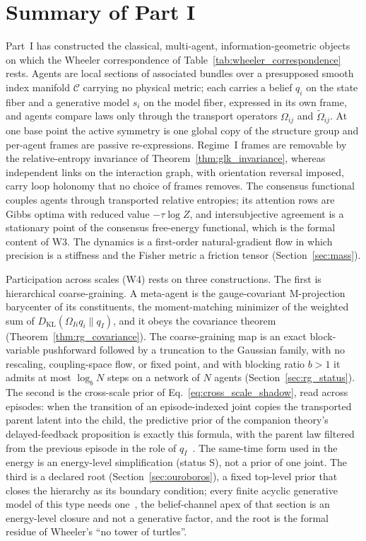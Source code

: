\section{Summary of Part I}\label{sec:conclusion}

Part~I has constructed the classical, multi-agent, information-geometric objects on which the Wheeler correspondence of Table~\ref{tab:wheeler_correspondence} rests. Agents are local sections of associated bundles over a presupposed smooth index manifold $\mathcal{C}$ carrying no physical metric; each carries a belief $q_i$ on the state fiber and a generative model $s_i$ on the model fiber, expressed in its own frame, and agents compare laws only through the transport operators $\Omega_{ij}$ and $\tilde\Omega_{ij}$. At one base point the active symmetry is one global copy of the structure group and per-agent frames are passive re-expressions. Regime~I frames are removable by the relative-entropy invariance of Theorem~\ref{thm:glk_invariance}, whereas independent links on the interaction graph, with orientation reversal imposed, carry loop holonomy that no choice of frames removes. The consensus functional couples agents through transported relative entropies; its attention rows are Gibbs optima with reduced value $-\tau\log Z$, and intersubjective agreement is a stationary point of the consensus free-energy functional, which is the formal content of W3. The dynamics is a first-order natural-gradient flow in which precision is a stiffness and the Fisher metric a friction tensor (Section~\ref{sec:mass}).

Participation across scales (W4) rests on three constructions. The first is hierarchical coarse-graining. A meta-agent is the gauge-covariant M-projection barycenter of its constituents, the moment-matching minimizer of the weighted sum of $D_{\mathrm{KL}}(\Omega_{Ii}q_i\|q_I)$, and it obeys the covariance theorem (Theorem~\ref{thm:rg_covariance}). The coarse-graining map is an exact block-variable pushforward followed by a truncation to the Gaussian family, with no rescaling, coupling-space flow, or fixed point, and with blocking ratio $b > 1$ it admits at most $\log_b N$ steps on a network of $N$ agents (Section~\ref{sec:rg_status}). The second is the cross-scale prior of Eq.~\eqref{eq:cross_scale_shadow}, read across episodes: when the transition of an episode-indexed joint copies the transported parent latent into the child, the predictive prior of the companion theory's delayed-feedback proposition is exactly this formula, with the parent law filtered from the previous episode in the role of $q_I$~\cite[Ch.~12]{DennisGaugeVFE2026}. The same-time form used in the energy is an energy-level simplification (status S), not a prior of one joint. The third is a declared root (Section~\ref{sec:ouroboros}), a fixed top-level prior that closes the hierarchy as its boundary condition; every finite acyclic generative model of this type needs one~\cite[Ch.~12]{DennisGaugeVFE2026}, the belief-channel apex of that section is an energy-level closure and not a generative factor, and the root is the formal residue of Wheeler's ``no tower of turtles''.

